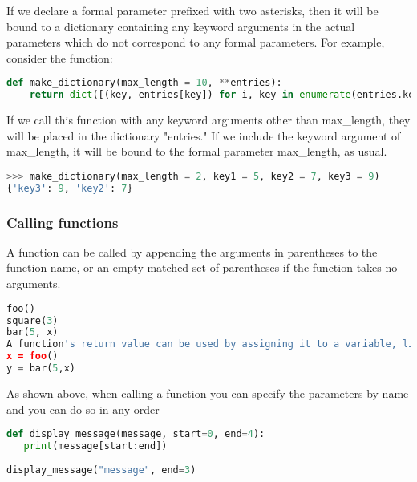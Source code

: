 If we declare a formal parameter prefixed with two asterisks, then it will be
bound to a dictionary containing any keyword arguments in the actual parameters
which do not correspond to any formal parameters. For example, consider the
function:
\lstset{basicstyle=\scriptsize, numbers=left, captionpos=b, tabsize=4}
\begin{lstlisting}[caption=Formal Parameter,language={Python},
xleftmargin=15pt, label=lst:formalparameter]
def make_dictionary(max_length = 10, **entries):
    return dict([(key, entries[key]) for i, key in enumerate(entries.keys()) if i < max_length])
\end{lstlisting}

If we call this function with any keyword arguments other than max\_length, they
will be placed in the dictionary "entries." If we include the keyword argument
of max\_length, it will be bound to the formal parameter max\_length, as usual.
\lstset{basicstyle=\scriptsize, numbers=left, captionpos=b, tabsize=4}
\begin{lstlisting}[caption=Formal Parameter usage,language={Python},
xleftmargin=15pt, label=lst:formalparameterusage]
>>> make_dictionary(max_length = 2, key1 = 5, key2 = 7, key3 = 9)
{'key3': 9, 'key2': 7}
\end{lstlisting}

\subsubsection{Calling functions}
A function can be called by appending the arguments in parentheses to the
function name, or an empty matched set of parentheses if the function takes no
arguments.
\lstset{basicstyle=\scriptsize, numbers=left, captionpos=b, tabsize=4}
\begin{lstlisting}[caption=Calling Function,language={Python},
xleftmargin=15pt, label=lst:callingfunction]
foo()
square(3)
bar(5, x)
A function's return value can be used by assigning it to a variable, like so:
x = foo()
y = bar(5,x)
\end{lstlisting}

As shown above, when calling a function you can specify the parameters by name
and you can do so in any order
\lstset{basicstyle=\scriptsize, numbers=left, captionpos=b, tabsize=4}
\begin{lstlisting}[caption=Var Args Specific,language={Python},
xleftmargin=15pt, label=lst:varargsspecific]
def display_message(message, start=0, end=4):
   print(message[start:end])
 
display_message("message", end=3)
\end{lstlisting}

